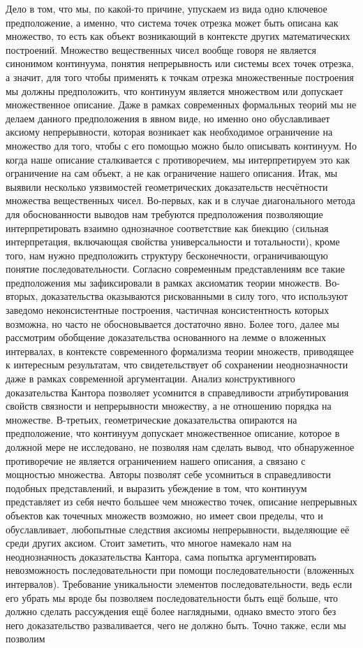 \documentclass[12pt]{article}
\begin{document}
Дело в том, что мы, по какой-то причине, упускаем из вида одно ключевое предположение, а именно, что система точек отрезка может быть описана как множество, то есть как объект возникающий в контексте других математических построений. Множество вещественных чисел вообще говоря не является синонимом континуума, понятия непрерывность или системы всех точек отрезка, а значит, для того чтобы применять к точкам отрезка множественные построения мы должны предположить, что континуум является множеством или допускает множественное описание. Даже в рамках современных формальных теорий мы не делаем данного предположения в явном виде, но именно оно обуславливает аксиому непрерывности, которая возникает как необходимое ограничение на множество для того, чтобы с его помощью можно было описывать континуум. Но когда наше описание сталкивается с противоречием, мы интерпретируем это как ограничение на сам объект, а не как ограничение нашего описания. Итак, мы выявили несколько уязвимостей геометрических доказательств несчётности множества вещественных чисел. Во-первых, как и в случае диагонального метода для обоснованности выводов нам требуются предположения позволяющие интерпретировать взаимно однозначное соответствие как биекцию (сильная интерпретация, включающая свойства универсальности и тотальности), кроме того, нам нужно предположить структуру бесконечности, ограничивающую понятие последовательности. Согласно современным представлениям все такие предположения мы зафиксировали в рамках аксиоматик теории множеств. Во-вторых, доказательства оказываются рискованными в силу того, что используют заведомо неконсистентные построения, частичная консистентность которых возможна, но часто не обосновывается достаточно явно. Более того, далее мы рассмотрим обобщение доказательства основанного на лемме о вложенных интервалах, в контексте современного формализма теории множеств, приводящее к интересным результатам, что свидетельствует об сохранении неоднозначности даже в рамках современной аргументации. Анализ конструктивного доказательства Кантора позволяет усомнится в справедливости атрибутирования свойств связности и непрерывности множеству, а не отношению порядка на множестве. В-третьих, геометрические доказательства опираются на предположение, что континуум допускает множественное описание, которое в должной мере не исследовано, не позволяя нам сделать вывод, что обнаруженное противоречие не является ограничением нашего описания, а связано с мощностью множества. Авторы позволят себе усомниться в справедливости подобных представлений, и выразить убеждение в том, что континуум представляет из себя нечто большее чем множество точек, описание непрерывных объектов как точечных множеств возможно, но имеет свои пределы, что и обуславливает, любопытные следствия аксиомы непрерывности, выделяющие её среди других аксиом. Стоит заметить, что многое намекало нам на неоднозначность доказательства Кантора, сама попытка аргументировать невозможность последовательности при помощи последовательности (вложенных интервалов). Требование уникальности элементов последовательности, ведь если его убрать мы вроде бы позволяем последовательности быть ещё больше, что должно сделать рассуждения ещё более наглядными, однако вместо этого без него доказательство разваливается, чего не должно быть. Точно также, если мы позволим 
\end{document}
